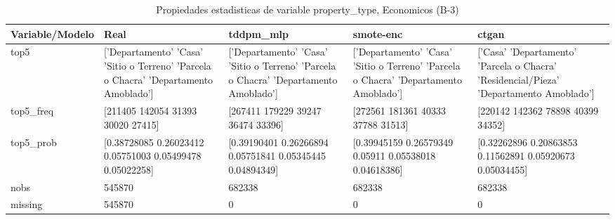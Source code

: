 \begin{table}[H]
\centering
\fontsize{8}{14}\selectfont
\caption{Propiedades  estadisticas de variable property\_type, Economicos (B-3)}
\label{table-stats-economicos-b-3-property_type}
\begin{tabular}{|l|m{10em}|m{10em}|m{10em}|m{10em}|}
\hline
 \rowcolor[gray]{0.8}
Variable/Modelo & Real & tddpm\_mlp & smote-enc & ctgan \\
\hline top5 & ['Departamento' 'Casa' 'Sitio o Terreno' 'Parcela o Chacra'
 'Departamento Amoblado'] & ['Departamento' 'Casa' 'Sitio o Terreno' 'Parcela o Chacra'
 'Departamento Amoblado'] & ['Departamento' 'Casa' 'Sitio o Terreno' 'Parcela o Chacra'
 'Departamento Amoblado'] & ['Casa' 'Departamento' 'Parcela o Chacra' 'Residencial/Pieza'
 'Departamento Amoblado'] \\
\hline top5\_freq & [211405 142054  31393  30020  27415] & [267411 179229  39247  36474  33396] & [272561 181361  40333  37788  31513] & [220142 142362  78898  40399  34352] \\
\hline top5\_prob & [0.38728085 0.26023412 0.05751003 0.05499478 0.05022258] & [0.39190401 0.26266894 0.05751841 0.05345445 0.04894349] & [0.39945159 0.26579349 0.05911    0.05538018 0.04618386] & [0.32262896 0.20863853 0.11562891 0.05920673 0.05034455] \\
\hline nobs & 545870 & 682338 & 682338 & 682338 \\
\hline missing & 545870 & 0 & 0 & 0 \\
\hline
\end{tabular}
\end{table}
